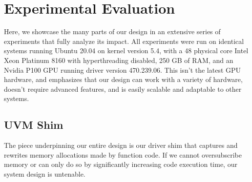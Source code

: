 \vspace*{-0.2cm}
\section{Experimental Evaluation}
\vspace*{\subsecspace}
\label{sec:eval}

Here, we showcase the many parts of our design in an extensive series of experiments that fully analyze its impact.
All experiments were run on identical systems running Ubuntu 20.04 on kernel version 5.4, with a 48 physical core Intel Xeon Platinum 8160 with hyperthreading disabled, 250 GB of RAM, and an Nvidia P100 GPU running driver version 470.239.06.
This isn't the latest GPU hardware, and emphasizes that our design can work with a variety of hardware, doesn't require advanced features, and is easily scalable and adaptable to other systems.

\subsection{UVM Shim}
\label{sec:shim}

The piece underpinning our entire design is our driver shim that captures and rewrites memory allocations made by function code.
If we cannot oversubscribe memory or can only do so by significantly increasing code execution time, our system design is untenable.

